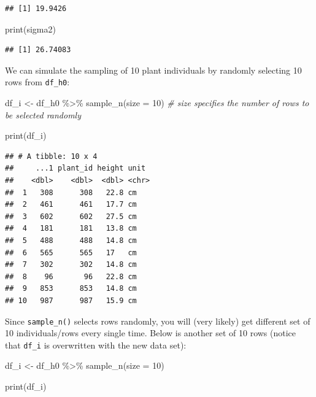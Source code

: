 \documentclass[
]{book}
\newenvironment{Shaded}{\begin{snugshade}}{\end{snugshade}}
\newcommand{\AttributeTok}[1]{\textcolor[rgb]{0.77,0.63,0.00}{#1}}
\newcommand{\CommentTok}[1]{\textcolor[rgb]{0.56,0.35,0.01}{\textit{#1}}}
\newcommand{\DecValTok}[1]{\textcolor[rgb]{0.00,0.00,0.81}{#1}}
\newcommand{\FunctionTok}[1]{\textcolor[rgb]{0.00,0.00,0.00}{#1}}
\newcommand{\NormalTok}[1]{#1}
\newcommand{\OtherTok}[1]{\textcolor[rgb]{0.56,0.35,0.01}{#1}}
\newcommand{\SpecialCharTok}[1]{\textcolor[rgb]{0.00,0.00,0.00}{#1}}
\begin{document}
\begin{verbatim}
## [1] 19.9426
\end{verbatim}

\begin{Shaded}
\begin{Highlighting}[]
\FunctionTok{print}\NormalTok{(sigma2)}
\end{Highlighting}
\end{Shaded}

\begin{verbatim}
## [1] 26.74083
\end{verbatim}

We can simulate the sampling of 10 plant individuals by randomly selecting 10 rows from \texttt{df\_h0}:

\begin{Shaded}
\begin{Highlighting}[]
\NormalTok{df\_i }\OtherTok{\textless{}{-}}\NormalTok{ df\_h0 }\SpecialCharTok{\%\textgreater{}\%} 
  \FunctionTok{sample\_n}\NormalTok{(}\AttributeTok{size =} \DecValTok{10}\NormalTok{) }\CommentTok{\# size specifies the number of rows to be selected randomly}

\FunctionTok{print}\NormalTok{(df\_i)}
\end{Highlighting}
\end{Shaded}

\begin{verbatim}
## # A tibble: 10 x 4
##     ...1 plant_id height unit 
##    <dbl>    <dbl>  <dbl> <chr>
##  1   308      308   22.8 cm   
##  2   461      461   17.7 cm   
##  3   602      602   27.5 cm   
##  4   181      181   13.8 cm   
##  5   488      488   14.8 cm   
##  6   565      565   17   cm   
##  7   302      302   14.8 cm   
##  8    96       96   22.8 cm   
##  9   853      853   14.8 cm   
## 10   987      987   15.9 cm
\end{verbatim}

Since \texttt{sample\_n()} selects rows randomly, you will (very likely) get different set of 10 individuals/rows every single time. Below is another set of 10 rows (notice that \texttt{df\_i} is overwritten with the new data set):

\begin{Shaded}
\begin{Highlighting}[]
\NormalTok{df\_i }\OtherTok{\textless{}{-}}\NormalTok{ df\_h0 }\SpecialCharTok{\%\textgreater{}\%} 
  \FunctionTok{sample\_n}\NormalTok{(}\AttributeTok{size =} \DecValTok{10}\NormalTok{)}

\FunctionTok{print}\NormalTok{(df\_i)}
\end{Highlighting}
\end{Shaded}
\end{document}
